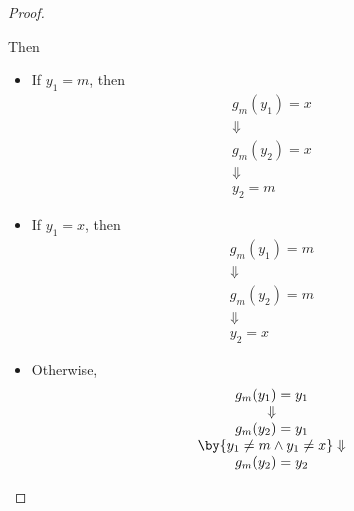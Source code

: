 \begin{proof}
\begin{enumerate}[label=\textbf{(\Alph*)}]
\begin{itemize}
\begin{itemize}
\begin{itemize}
                          \end{itemize}
                          Then
                          \begin{itemize}
                            \item If $y_{1} = m$, then
                                  \[
                                    \begin{array}{c}
                                      g_{m}(y_{1}) = x \\
                                      \Downarrow       \\
                                      g_{m}(y_{2}) = x \\
                                      \Downarrow       \\
                                      y_{2} = m
                                    \end{array}
                                  \]
                            \item If $y_{1} = x$, then
                                  \[
                                    \begin{array}{c}
                                      g_{m}(y_{1}) = m \\
                                      \Downarrow       \\
                                      g_{m}(y_{2}) = m \\
                                      \Downarrow       \\
                                      y_{2} = x
                                    \end{array}
                                  \]
                            \item Otherwise,
                                  \[
                                    \begin{array}{c}
                                      g_{m}(y_{1}) = y_{1}                                         \\
                                      \Downarrow                                                   \\
                                      g_{m}(y_{2}) = y_{1}                                         \\
                                      \by{\ensuremath{y_{1} \neq m \land y_{1} \neq x}} \Downarrow \\
                                      g_{m}(y_{2}) = y_{2}                                         \\

\end{array}\]
\end{itemize}
\end{itemize}
\end{itemize}
\end{enumerate}
\end{proof}

